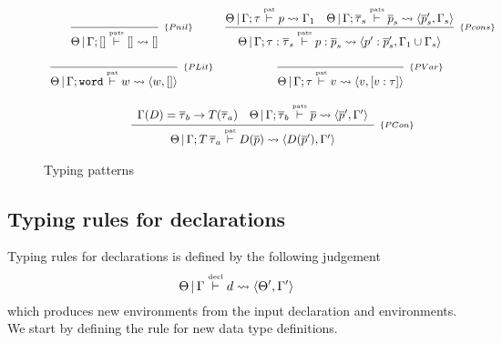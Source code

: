 \documentclass[a4paper, 11pt]{article}
\begin{document}
\begin{figure}[H]
  \[
    \begin{array}{cc}
      \infer[_{\{Pnil\}}]
            {\Theta\,|\,\Gamma ; [] \typing{pats} [] \leadsto []}
            {}
      & 
      \infer[_{\{Pcons\}}]
            {\Theta\,|\,\Gamma ; \tau : \overline{\tau}_s \typing{pats} p : \overline{p}_s \leadsto  \langle p' : \overline{p}'_s, \Gamma_1 \cup \Gamma_s \rangle}
            {\Theta\,|\,\Gamma ; \tau \typing{pat} p \leadsto \Gamma_1 
             &
             \Theta\,|\,\Gamma ; \overline{\tau}_s \typing{pats} \overline{p}_s \leadsto \langle \overline{p}'_s, \Gamma_s \rangle}
      \\ \\ 
        \infer[_{\{PLit\}}]
              {\Theta\,|\,\Gamma ; \word \typing{pat} w \leadsto \langle w, []\rangle}
              {}
      & 
        \infer[_{\{PVar\}}]
              {\Theta\,|\,\Gamma ; \tau \typing{pat} v \leadsto \langle v, [v : \tau] \rangle}
              {}
      \\ \\
      \multicolumn{2}{c}{
        \infer[_{\{PCon\}}]
              {\Theta\,|\,\Gamma ; T\,\overline{\tau}_a \typing{pat} D(\overline{p}) \leadsto \langle D(\overline{p}'), \Gamma' \rangle}
              {\begin{array}{cc}
                  \Gamma(D) = \overline{\tau}_b \to T (\overline{\tau}_a) 
                  & 
                  \Theta\,|\,\Gamma ; \overline{\tau}_b \typing{pats} \overline{p} \leadsto \langle \overline{p}', \Gamma'\rangle
               \end{array}}
      }
    \end{array}
  \]
  \centering
  \caption{Typing patterns}
  \label{fig:patterns}
\end{figure}

\subsection{Typing rules for declarations}

Typing rules for declarations is defined by the following judgement
\[\Theta\,|\,\Gamma \overset{\text{\tiny{decl}}}{\vdash} d \leadsto \langle \Theta', \Gamma' \rangle\]
which produces new environments from the input declaration and environments.
We start by defining the rule for new data type definitions.
\end{document}

